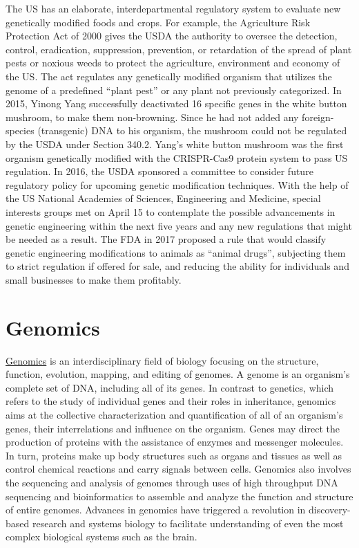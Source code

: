 The US has an elaborate, interdepartmental regulatory system to evaluate new genetically modified foods and crops. For example, the Agriculture Risk Protection Act of 2000 gives the USDA the authority to oversee the detection, control, eradication, suppression, prevention, or retardation of the spread of plant pests or noxious weeds to protect the agriculture, environment and economy of the US. The act regulates any genetically modified organism that utilizes the genome of a predefined ``plant pest'' or any plant not previously categorized. In 2015, Yinong Yang successfully deactivated 16 specific genes in the white button mushroom, to make them non-browning. Since he had not added any foreign-species (transgenic) DNA to his organism, the mushroom could not be regulated by the USDA under Section 340.2. Yang's white button mushroom was the first organism genetically modified with the CRISPR-Cas9 protein system to pass US regulation. In 2016, the USDA sponsored a committee to consider future regulatory policy for upcoming genetic modification techniques. With the help of the US National Academies of Sciences, Engineering and Medicine, special interests groups met on April 15 to contemplate the possible advancements in genetic engineering within the next five years and any new regulations that might be needed as a result. The FDA in 2017 proposed a rule that would classify genetic engineering modifications to animals as ``animal drugs'', subjecting them to strict regulation if offered for sale, and reducing the ability for individuals and small businesses to make them profitably.

\hypertarget{genomics-1}{%
\chapter{Genomics}\label{genomics-1}}

\href{https://en.wikipedia.org/wiki/Genomics}{Genomics} is an interdisciplinary field of biology focusing on the structure, function, evolution, mapping, and editing of genomes. A genome is an organism's complete set of DNA, including all of its genes. In contrast to genetics, which refers to the study of individual genes and their roles in inheritance, genomics aims at the collective characterization and quantification of all of an organism's genes, their interrelations and influence on the organism. Genes may direct the production of proteins with the assistance of enzymes and messenger molecules. In turn, proteins make up body structures such as organs and tissues as well as control chemical reactions and carry signals between cells. Genomics also involves the sequencing and analysis of genomes through uses of high throughput DNA sequencing and bioinformatics to assemble and analyze the function and structure of entire genomes. Advances in genomics have triggered a revolution in discovery-based research and systems biology to facilitate understanding of even the most complex biological systems such as the brain.

